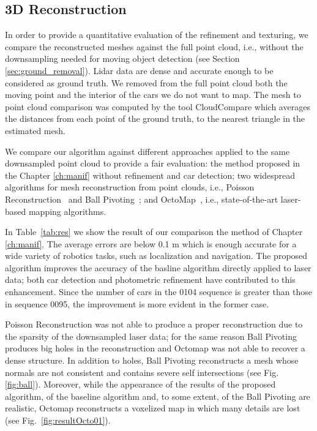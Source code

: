 \subsection{3D Reconstruction}

In order to provide a quantitative evaluation of the refinement and texturing, we compare the reconstructed meshes against the full point cloud, i.e., without the downsampling needed for moving object detection (see Section~ \ref{sec:ground_removal}). Lidar data are dense and accurate enough to be considered as ground truth. 
We removed from the full point cloud both the moving point and the interior of the cars we do not want to map.
The mesh to point cloud comparison was computed by the tool CloudCompare \cite{cloudcompare} which averages the distances from each point of the ground truth, to the  nearest triangle in the estimated mesh.

We compare our algorithm against different approaches applied to the same downsampled point cloud to provide a fair evaluation: the method proposed in the Chapter \ref{ch:manif} without refinement and car detection; two widespread algorithms for mesh reconstruction from point clouds, i.e., Poisson Reconstruction~\cite{kazhdan2006poisson} and Ball Pivoting~\cite{bernardini1999ball}; and OctoMap~\cite{hornung2013octomap}, i.e., state-of-the-art laser-based mapping algorithms.

In Table~\ref{tab:res} we show the result of our comparison  the method of Chapter \ref{ch:manif}.
The average errors are below 0.1 m which is enough accurate for a wide variety of robotics tasks, such as localization and navigation. 
The proposed algorithm improves the accuracy of the basline algorithm directly applied to laser data; both car detection and photometric refinement have contributed to this enhancement. 
Since the number of cars in the 0104 sequence is greater than those in sequence 0095, the improvement is more evident in the former case.

Poisson Reconstruction was not able to produce a proper reconstruction due to the sparsity of the downsampled laser data; for the same reason Ball Pivoting produces big holes in the reconstruction and Octomap was not able to recover a dense structure. 
In addition to holes, Ball Pivoting reconstructs a mesh whose normals are not consistent and contains severe self intersections (see Fig. \ref{fig:ball}).
Moreover, while the appearance of the results of the proposed algorithm, of the baseline algorithm and, to some extent, of the Ball Pivoting are realistic, Octomap reconstructs a voxelized map in which many details are lost (see  Fig.~\ref{fig:resultOcto01}).


